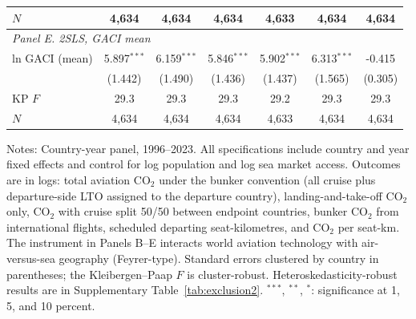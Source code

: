 \begin{table}[htbp]
\begin{threeparttable}
\begin{tabular}{lcccccc}
  $N$ & 4,634 & 4,634 & 4,634 & 4,633 & 4,634 & 4,634 \\
\midrule
\multicolumn{7}{l}{\textit{Panel E. 2SLS, GACI mean}} \\
  ln GACI (mean) & 5.897$^{***}$ & 6.159$^{***}$ & 5.846$^{***}$ & 5.902$^{***}$ & 6.313$^{***}$ & -0.415 \\
   & (1.442) & (1.490) & (1.436) & (1.437) & (1.565) & (0.305) \\
  KP $F$ & 29.3 & 29.3 & 29.3 & 29.2 & 29.3 & 29.3 \\
  $N$ & 4,634 & 4,634 & 4,634 & 4,633 & 4,634 & 4,634 \\
\bottomrule
\end{tabular}
\begin{tablenotes}[flushleft]
\footnotesize
\item Notes: Country-year panel, 1996--2023. All specifications include country and year fixed effects and control for log population and log sea market access. Outcomes are in logs: total aviation CO$_2$ under the bunker convention (all cruise plus departure-side LTO assigned to the departure country), landing-and-take-off CO$_2$ only, CO$_2$ with cruise split 50/50 between endpoint countries, bunker CO$_2$ from international flights, scheduled departing seat-kilometres, and CO$_2$ per seat-km. The instrument in Panels B--E interacts world aviation technology with air-versus-sea geography (Feyrer-type). Standard errors clustered by country in parentheses; the Kleibergen--Paap $F$ is cluster-robust. Heteroskedasticity-robust results are in Supplementary Table~\ref{tab:exclusion2}. $^{***}$, $^{**}$, $^{*}$: significance at 1, 5, and 10 percent.
\end{tablenotes}
\end{threeparttable}
\end{table}

